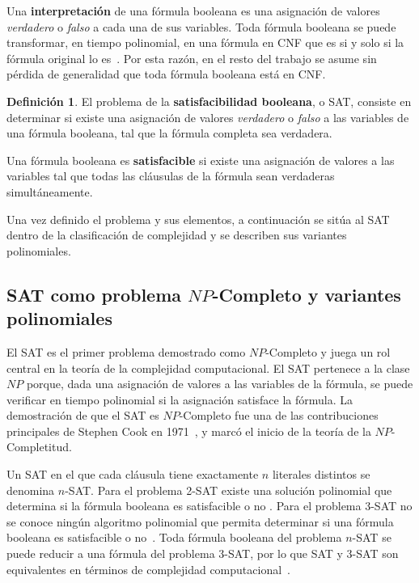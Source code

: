 \documentclass{article}
\theoremstyle{definition}
\newtheorem{definicion}{Definición}
\theoremstyle{plain}
\theoremstyle{remark}
\begin{document}
Una \textbf{interpretación} de una fórmula booleana es una asignación
de valores \textit{verdadero} o \textit{falso} a cada una de sus
variables. Toda fórmula booleana se puede transformar, en tiempo
polinomial, en una fórmula en CNF que es  si y solo si la
fórmula original lo es~\cite{hopcroft2006introduction}. Por esta
razón, en el resto del trabajo se asume sin pérdida de generalidad
que toda fórmula booleana está en CNF.

\begin{definicion}
  El problema de la \textbf{satisfacibilidad booleana}, o SAT, consiste
  en determinar si existe una asignación de valores \textit{verdadero} o
  \textit{falso} a las variables de una fórmula booleana, tal que la
  fórmula completa sea verdadera.
\end{definicion}

Una fórmula booleana  es \textbf{satisfacible} si existe una
asignación de valores a las variables tal que todas las cláusulas de la
fórmula sean verdaderas simultáneamente.

Una vez definido el problema y sus elementos, a continuación se sitúa
al SAT dentro de la clasificación de complejidad y se describen sus
variantes polinomiales.

\subsection{SAT como problema $NP$-Completo y variantes polinomiales}
\label{sec:sat-variantes}

El SAT es el primer problema demostrado como $NP$-Completo y juega un
rol central en la teoría de la complejidad computacional. El SAT pertenece a la clase
$NP$ porque, dada una asignación de valores a las variables de la
fórmula, se puede verificar en tiempo polinomial si la asignación
satisface la fórmula. La demostración de que el SAT es $NP$-Completo
fue una de las contribuciones principales de Stephen Cook en
1971~\cite{cook1971}, y marcó el inicio de la teoría de la
$NP$-Completitud.

Un SAT en el que cada cláusula tiene exactamente $n$ literales distintos
se denomina $n$-SAT. Para el problema 2-SAT existe una solución
polinomial que determina si la fórmula booleana es satisfacible o no
\cite{halim2013cp3}. Para el problema 3-SAT no se conoce ningún
algoritmo polinomial que permita determinar si una fórmula booleana es
satisfacible o no~\cite{hopcroft2006introduction}. Toda fórmula booleana
del problema $n$-SAT se puede reducir a una fórmula  del
problema 3-SAT, por lo que SAT y 3-SAT son equivalentes en términos de
complejidad computacional~\cite{hopcroft2006introduction}.
\end{document}
